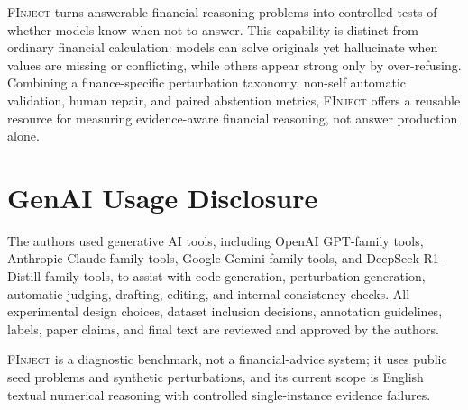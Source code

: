 \documentclass[sigconf,review]{acmart}
\newcommand{\bench}{\textsc{FInject}\xspace}
\begin{document}
\bench turns answerable financial reasoning problems into controlled tests of whether models know when not to answer. 
This capability is distinct from ordinary financial calculation: models can solve originals yet hallucinate when values are missing or conflicting, while others appear strong only by over-refusing. 
Combining a finance-specific perturbation taxonomy, non-self automatic validation, human repair, and paired abstention metrics, \bench offers a reusable resource for measuring evidence-aware financial reasoning, not answer production alone.




\section*{GenAI Usage Disclosure}

The authors used generative AI tools, including OpenAI GPT-family tools, Anthropic Claude-family tools, Google Gemini-family tools, and DeepSeek-R1-Distill-family tools, to assist with code generation, perturbation generation, automatic judging, drafting, editing, and internal consistency checks. All experimental design choices, dataset inclusion decisions, annotation guidelines, labels, paper claims, and final text are reviewed and approved by the authors.

\bench is a diagnostic benchmark, not a financial-advice system; it uses public seed problems and synthetic perturbations, and its current scope is English textual numerical reasoning with controlled single-instance evidence failures.



\end{document}
